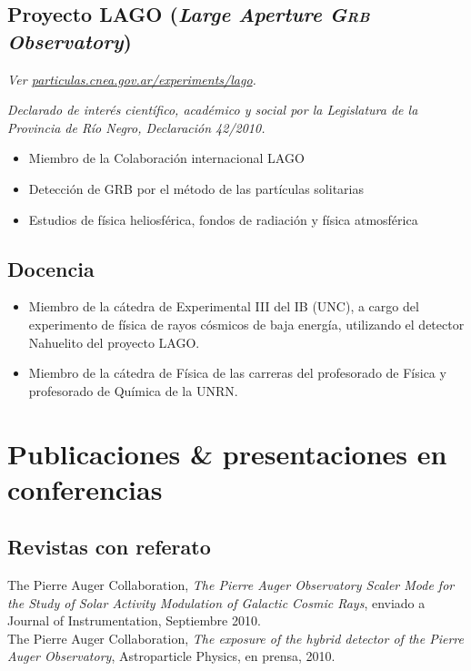 \documentclass[11pt, a4paper]{article}
\newcommand{\years}[1]{\marginnote{\scriptsize #1}}
\begin{document}
\subsection*{Proyecto LAGO ({\emph{Large Aperture \textsc{Grb} Observatory}})}
\small\textit{Ver
\href{http://particulas.cnea.gov.ar/experiments/lago/}{particulas.cnea.gov.ar/experiments/lago}.
}

{\emph{Declarado de interés científico, académico y social por la Legislatura de la
Provincia de Río Negro, Declaración 42/2010.}}

\begin{itemize}
\item Miembro de la Colaboración internacional LAGO
\item Detección de GRB por el método de las partículas solitarias
\item Estudios de física heliosférica, fondos de radiación y física atmosférica
\end{itemize}

\subsection*{Docencia}

\begin{itemize}
\item Miembro de la cátedra de Experimental III del IB (UNC), a cargo del experimento de física de rayos cósmicos de baja energía, utilizando el detector Nahuelito del proyecto LAGO. 
\item Miembro de la cátedra de Física de las carreras del profesorado de Física y profesorado de Química de la UNRN.
\end{itemize}
 
\section*{Publicaciones \& presentaciones en conferencias}

\subsection*{Revistas con referato}
\noindent
\years{2010}The Pierre Auger Collaboration, {\emph{The Pierre Auger Observatory
Scaler Mode for the Study of Solar Activity Modulation of Galactic Cosmic
Rays}}, enviado a Journal of Instrumentation, Septiembre 2010.\\

\years{2010}The Pierre Auger Collaboration, {\emph{The exposure of the hybrid
detector of the Pierre Auger Observatory}}, Astroparticle Physics, en prensa,
2010.\\
\end{document}
